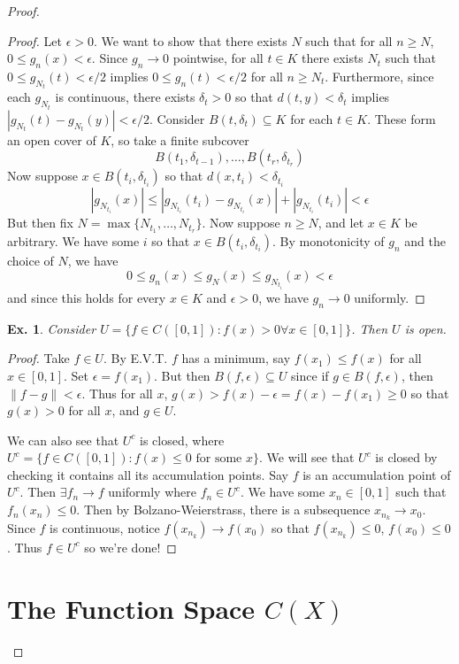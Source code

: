 \documentclass[12pt, a4paper]{book}
\newcommand{\norm}[1]{\left\lVert#1\right\rVert} %
\newtheorem{example}[theorem]{Ex.}
\theoremstyle{nonumberplain}
\newtheorem{proof}{Proof}
\begin{document}
\begin{proof}
\begin{proof}
    Let $\epsilon>0$.
    We want to show that there exists $N$ such that for all $n\geq N$, $0\leq g_n(x)<\epsilon$.
    Since $g_n\to 0$ pointwise, for all $t\in K$ there exists $N_t$ such that $0\leq g_{N_t}(t)<\epsilon/2$ implies $0\leq g_n(t)<\epsilon/2$ for all $n\geq N_t$.
    Furthermore, since each $g_{N_t}$ is continuous, there exists $\delta_t>0$ so that $d(t,y)<\delta_t$ implies $|g_{N_t}(t)-g_{N_t}(y)|<\epsilon/2$.
    Consider $B(t,\delta_t)\subseteq K$ for each $t\in K$.
    These form an open cover of $K$, so take a finite subcover
    \[B(t_1,\delta_{t-1}),\ldots,B(t_r,\delta_{t_r})\]
    Now suppose $x\in B(t_i,\delta_{t_i})$ so that $d(x,t_i)<\delta_{t_i}$
    \[|g_{N_{t_i}}(x)|\leq |g_{N_{t_i}}(t_i)-g_{N_{t_i}}(x)|+|g_{N_{t_i}}(t_i)|<\epsilon\]
    But then fix $N=\max\{N_{t_1},\ldots,N_{t_r}\}$.
    Now suppose $n\geq N$, and let $x\in K$ be arbitrary.
    We have some $i$ so that $x\in B(t_i,\delta_{t_i})$.
    By monotonicity of $g_n$ and the choice of $N$, we have
    \[0\leq g_n(x)\leq g_N(x)\leq g_{N_{t_i}}(x)<\epsilon\]
    and since this holds for every $x\in K$ and $\epsilon>0$, we have $g_n\to 0$ uniformly.
\end{proof}
\begin{example}
    Consider $U=\{f\in C([0,1]):f(x)>0\forall x\in[0,1]\}$. Then $U$ is open.
\end{example}
\begin{proof}
    Take $f\in U$.
    By E.V.T. $f$ has a minimum, say $f(x_1)\leq f(x)$ for all $x\in[0,1]$.
    Set $\epsilon=f(x_1)$.
    But then $B(f,\epsilon)\subseteq U$ since if $g\in B(f,\epsilon)$, then $\norm{f-g}<\epsilon$.
    Thus for all $x$, $g(x)>f(x)-\epsilon=f(x)-f(x_1)\geq 0$ so that $g(x)>0$ for all $x$, and $g\in U$.

    We can also see that $U^c$ is closed, where $U^c=\{f\in C([0,1]):\text{$f(x)\leq 0$ for some $x$}\}$.
    We will see that $U^c$ is closed by checking it contains all its accumulation points.
    Say $f$ is an accumulation point of $U^c$.
    Then $\exists f_n\to f$ uniformly where $f_n\in U^c$.
    We have some $x_n\in[0,1]$ such that $f_n(x_n)\leq 0$.
    Then by Bolzano-Weierstrass, there is a subsequence $x_{n_k}\to x_0$.
    Since $f$ is continuous, notice $f(x_{n_k})\to f(x_0)$ so that $f(x_{n_k})\leq 0$, $f(x_0)\leq 0$.
    Thus $f\in U^c$ so we're done!
\end{proof}
\chapter{The Function Space $C(X)$}

\end{proof}
\end{document}
